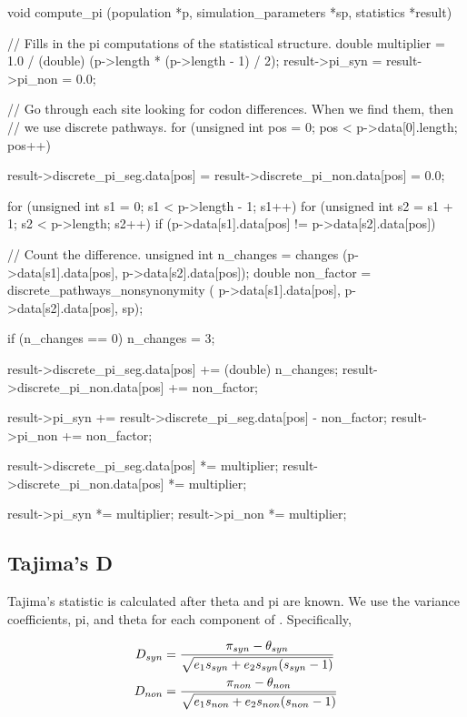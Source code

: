 \documentclass{article}
\begin{document}
\begin{ccode}
void compute_pi (population *p, simulation_parameters *sp, statistics *result) {
  // Fills in the pi computations of the statistical structure.
  double multiplier = 1.0 / (double) (p->length * (p->length - 1) / 2);
  result->pi_syn = result->pi_non = 0.0;

  // Go through each site looking for codon differences. When we find them, then
  // we use discrete pathways.
  for (unsigned int pos = 0; pos < p->data[0].length; pos++) {
    result->discrete_pi_seg.data[pos] =
      result->discrete_pi_non.data[pos] = 0.0;

    for (unsigned int s1 = 0; s1 < p->length - 1; s1++)
      for (unsigned int s2 = s1 + 1; s2 < p->length; s2++)
	if (p->data[s1].data[pos] != p->data[s2].data[pos]) {
	  // Count the difference.
	  unsigned int	n_changes  = changes (p->data[s1].data[pos], p->data[s2].data[pos]);
	  double	non_factor = discrete_pathways_nonsynonymity (
	    p->data[s1].data[pos], p->data[s2].data[pos], sp);

	  if (n_changes == 0) n_changes = 3;

	  result->discrete_pi_seg.data[pos] += (double) n_changes;
	  result->discrete_pi_non.data[pos] += non_factor;

	  result->pi_syn += result->discrete_pi_seg.data[pos] - non_factor;
	  result->pi_non += non_factor;
	}

    result->discrete_pi_seg.data[pos] *= multiplier;
    result->discrete_pi_non.data[pos] *= multiplier;
  }

  result->pi_syn *= multiplier;
  result->pi_non *= multiplier;
}
\end{ccode}

    \subsection{Tajima's D}
      \label{sec:d-statistic}

      Tajima's \D{} statistic is calculated after theta and pi are known. We use
      the variance coefficients, pi, and theta for each component of \D{}.
      Specifically,

      \begin{align*}
	D_{syn} & = {\pi_{syn} - \theta_{syn} \over
		     \sqrt{e_1 s_{syn} + e_2 s_{syn} (s_{syn} - 1)}} \\ %
	D_{non} & = {\pi_{non} - \theta_{non} \over
		     \sqrt{e_1 s_{non} + e_2 s_{non} (s_{non} - 1)}}
      \end{align*}
\end{document}
